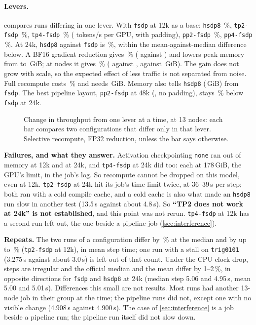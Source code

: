 \paragraph{Levers.}  compares runs differing in one lever. With \texttt{fsdp} at 12k as a base: \texttt{hsdp8} \TriLevHsdp\,\%, \texttt{tp2-fsdp} \TriLevTwoLarge\,\%, \texttt{tp4-fsdp} \TriLevFourLarge\,\% (\TriTokTpFour{} tokens/s per GPU, with padding), \texttt{pp2-fsdp} \TriLevPpTwo\,\%, \texttt{pp4-fsdp} \TriLevPpFour\,\%. At 24k, \texttt{hsdp8} against \texttt{fsdp} is \TriLevHsdpLarge\,\%, within the mean-against-median difference below. A BF16 gradient reduction gives \TriLevReduce\,\% (\TriTokReduce{} against \TriTokFsdp) and lowers peak memory from \TriMemFsdp{} to \TriMemReduce\,GiB; at \TriLevReduceTopNodes{} nodes it gives \TriLevReduceTop\,\% (\TriTokReduceTop{} against \TriTokFsdpTop, \TriMemReduceTop{} against \TriMemFsdpTop\,GiB). The gain does not grow with scale, so the expected effect of less traffic is not separated from noise. Full recompute costs \TriLevFull\,\% and needs \TriMemFull\,GiB. Memory also tells \texttt{hsdp8} (\TriMemHsdp\,GiB) from \texttt{fsdp}. The best pipeline layout, \texttt{pp2-fsdp} at 48k (\TriTokPpBest{}, no padding), stays \TriLevPpBest\,\% below \texttt{fsdp} at 24k.

\begin{figure}[h]
  \centering{}
  \caption{Change in throughput from one lever at a time, at 13 nodes: each bar compares two configurations that differ only in that lever. Selective recompute, FP32 reduction, unless the bar says otherwise. }
  \label{fig:qwen_levers}
\end{figure}

\textbf{Failures, and what they answer.} Activation checkpointing \texttt{none} ran out of memory at 12k and at 24k, and \texttt{tp4-fsdp} at 24k did too: each at 178\,GiB, the GPU's limit, in the job's log. So recompute cannot be dropped on this model, even at 12k. \texttt{tp2-fsdp} at 24k hit its job's time limit twice, at 36--39\,s per step; both ran with a cold compile cache, and a cold cache is also what made an \texttt{hsdp8} run slow in another test (13.5\,s against about 4.8\,s). So \textbf{``TP2 does not work at 24k'' is not established}, and this point was not rerun. \texttt{tp4-fsdp} at 12k has a second run left out, the one beside a pipeline job (\cref{sec:interference}).

\textbf{Repeats.} The two runs of a configuration differ by \TriLayoutRepeatMedian\,\% at the median and by up to \TriLayoutRepeatMax\,\% (\texttt{tp2-fsdp} at 12k), in mean step time; one run with a stall on \texttt{trig0101} (3.275\,s against about 3.0\,s) is left out of that count. Under the CPU clock drop, steps are irregular and the official median and the mean differ by 1--2\,\%, in opposite directions for \texttt{fsdp} and \texttt{hsdp8} at 24k (median step 5.06 and 4.95\,s, mean 5.00 and 5.01\,s). Differences this small are not results. Most runs had another 13-node job in their group at the time; the pipeline runs did not, except one with no visible change (4.908\,s against 4.900\,s). The case of \cref{sec:interference} is a job beside a pipeline run; the pipeline run itself did not slow down.

